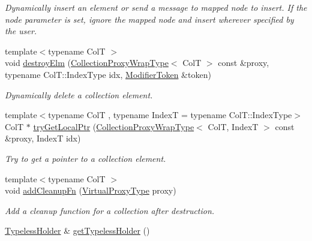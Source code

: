 \begin{DoxyCompactItemize}
\begin{DoxyCompactList}\small\item\em Dynamically insert an element or send a message to mapped node to insert. If the {\ttfamily node} parameter is set, ignore the mapped node and insert wherever specified by the user. \end{DoxyCompactList}\item 
{\footnotesize template$<$typename ColT $>$ }\\void \hyperlink{structvt_1_1vrt_1_1collection_1_1_collection_manager_a85a108cba84e45371d2c29d3072adcbe}{destroy\+Elm} (\hyperlink{structvt_1_1vrt_1_1collection_1_1_collection_manager_a56458ed7f9bb22b631b9b3a745f42f94}{Collection\+Proxy\+Wrap\+Type}$<$ ColT $>$ const \&proxy, typename Col\+T\+::\+Index\+Type idx, \hyperlink{structvt_1_1vrt_1_1collection_1_1_modifier_token}{Modifier\+Token} \&token)
\begin{DoxyCompactList}\small\item\em Dynamically delete a collection element. \end{DoxyCompactList}\item 
{\footnotesize template$<$typename ColT , typename IndexT  = typename Col\+T\+::\+Index\+Type$>$ }\\ColT $\ast$ \hyperlink{structvt_1_1vrt_1_1collection_1_1_collection_manager_a09bd0e2b03bd5f638bdc44f7ffeef715}{try\+Get\+Local\+Ptr} (\hyperlink{structvt_1_1vrt_1_1collection_1_1_collection_manager_a56458ed7f9bb22b631b9b3a745f42f94}{Collection\+Proxy\+Wrap\+Type}$<$ ColT, IndexT $>$ const \&proxy, IndexT idx)
\begin{DoxyCompactList}\small\item\em Try to get a pointer to a collection element. \end{DoxyCompactList}\item 
{\footnotesize template$<$typename ColT $>$ }\\void \hyperlink{structvt_1_1vrt_1_1collection_1_1_collection_manager_a3ef00b90a3a2d066a7f83b9c32b301d2}{add\+Cleanup\+Fn} (\hyperlink{namespacevt_a1b417dd5d684f045bb58a0ede70045ac}{Virtual\+Proxy\+Type} proxy)
\begin{DoxyCompactList}\small\item\em Add a cleanup function for a collection after destruction. \end{DoxyCompactList}\item 
\hyperlink{structvt_1_1vrt_1_1collection_1_1_typeless_holder}{Typeless\+Holder} \& \hyperlink{structvt_1_1vrt_1_1collection_1_1_collection_manager_ac6a8ac3b0b5583f426932e95012f8332}{get\+Typeless\+Holder} ()

\end{DoxyCompactItemize}
